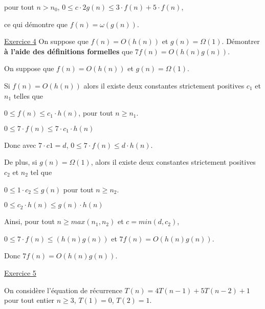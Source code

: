 \documentclass[11pt]{article}
\begin{document}
    \begin{center}
        pour tout $n > n_0$, $0 \leq c\cdot 2g(n)\leq 3\cdot f(n) + 5\cdot f(n)$,
    \end{center}
    ce qui démontre que $f(n) = \omega\left(g(n)\right)$.


\bigskip

\underline{Exercice 4}
On suppose que $f(n) = O\left(h(n)\right)$ et $g(n) = \Omega \left(1\right)$. Démontrer \textbf{à l'aide des définitions formelles} que $7f(n) =O \left( h(n) g(n)\right)$.

\bigskip

    On suppose que $f(n) = O\left(h(n)\right)$ et $g(n) = \Omega \left(1\right)$.
    
    Si $f(n) = O\left(h(n)\right)$ alors il existe deux constantes strictement positives $c_1$ et $n_1$ telles que
    \begin{center}
        $0\leq f(n) \leq c_1 \cdot h(n)$, pour tout $n \geq n_1$.
        
        $0 \leq 7\cdot f(n) \leq 7\cdot c_1\cdot h(n)$
    \end{center}
    
    

    Donc avec $7\cdot c1 = d$, $0 \leq 7\cdot f(n) \leq d\cdot h(n)$.

    \bigskip

    De plus, si $g(n) = \Omega \left(1\right)$, alors il existe deux constantes strictement positives $c_2$ et $n_2$ tel que

    $0\leq 1\cdot c_2 \leq g(n)$ pour tout $n \geq n_2$.

    $0 \leq c_2\cdot h(n) \leq g(n)\cdot h(n)$

    \bigskip

    Ainsi, pour tout $n \geq max(n_1,n_2)$ et $c = min(d, c_2)$, 
    
    $0 \leq 7\cdot f(n) \leq \left( h(n) g(n)\right)$ et $7f(n) = O \left( h(n) g(n)\right)$.

    Donc $7f(n) =O \left( h(n) g(n)\right)$.
    
\bigskip


\underline{Exercice 5} 

On considère l’équation de récurrence $T(n)=4T(n-1) + 5T(n-2) +1$ pour tout entier $n \geq 3$, $T(1)=0$, $T(2)=1$.
\end{document}
